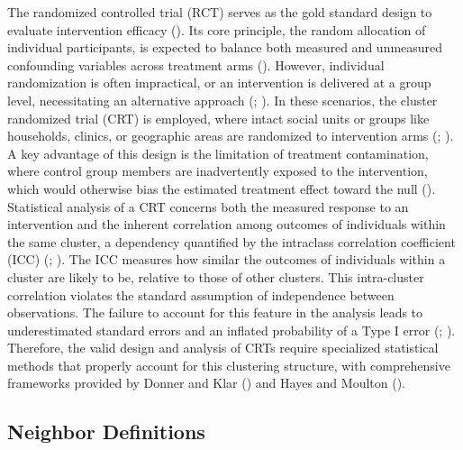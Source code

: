 \documentclass[
  12pt,
  prelim]{bios-prelim}
\begin{document}
The randomized controlled trial (RCT) serves as the gold standard design
to evaluate intervention efficacy (). Its core principle, the random allocation of individual
participants, is expected to balance both measured and unmeasured
confounding variables across treatment arms
(). However,
individual randomization is often impractical, or an intervention is
delivered at a group level, necessitating an alternative approach
(;
). In these
scenarios, the cluster randomized trial (CRT) is employed, where intact
social units or groups like households, clinics, or geographic areas are
randomized to intervention arms
(;
). A key advantage of
this design is the limitation of treatment contamination, where control
group members are inadvertently exposed to the intervention, which would
otherwise bias the estimated treatment effect toward the null
(). Statistical
analysis of a CRT concerns both the measured response to an intervention
and the inherent correlation among outcomes of individuals within the
same cluster, a dependency quantified by the intraclass correlation
coefficient (ICC) (; ). The ICC
measures how similar the outcomes of individuals within a cluster are
likely to be, relative to those of other clusters. This intra-cluster
correlation violates the standard assumption of independence between
observations. The failure to account for this feature in the analysis
leads to underestimated standard errors and an inflated probability of a
Type I error (; ).
Therefore, the valid design and analysis of CRTs require specialized
statistical methods that properly account for this clustering structure,
with comprehensive frameworks provided by Donner and Klar
() and Hayes and Moulton
().

\subsection{Neighbor Definitions}\label{neighbor-definitions}
\end{document}
